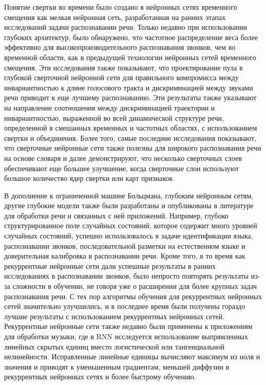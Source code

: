Понятие свертки во времени было создано в нейронных сетях временного смещения как мелкая нейронная сеть, разработанная на ранних этапах исследований задачи распознавании речи. Только недавно при использовании глубоких архитектур, было обнаружено, что частотное распределение веса более эффективно для высокопроизводительного распознавания звонков, чем во временной области, как в предыдущей технологии нейронных сетей временного смещения. Эти исследования также показывают, что проектирование пула в глубокой сверточной нейронной сети для правильного компромисса между инвариантностью к длине голосового тракта и дискриминацией между звуками речи приводит к еще лучшему распознаванию. Эти результаты также указывают на направление соотношения между дискриминацией траектории и инвариантностью, выраженной во всей динамической структуре речи, определенной в смешанных временных и частотных областях, с использованием свертки и объединения. Более того, самые последние исследования показывают, что сверточные нейронные сети также полезны для широкого распознавания речи на основе словаря и далее демонстрируют, что несколько сверточных слоев обеспечивают еще большее улучшение, когда сверточные слои используют большое количество ядер свертки или карт признаков.

В дополнение к ограниченной машине Больцмана, глубоким нейронным сетям, другие глубокие модели также были разработаны и опубликованы в литературе для обработки речи и связанных с ней приложений. Например, глубоко структурированное поле случайных состояний, которое содержит много уровней случайных состояний, успешно использовалось в задаче идентификации языка, распознавании звонков, последовательной разметки на естественном языке и доверительная калибровка в распознавании речи. Кроме того, в то время как рекуррентные нейронные сети дали успешные результаты в ранних исследованиях в распознавании звонков, было непросто повторять результаты из-за сложности в обучении, не говоря уже о расширении для более крупных задач распознавания речи. С тех пор алгоритмы обучения для рекуррентных нейронных сетей значительно улучшились, и в последнее время были получены гораздо лучшие результаты с использованием рекуррентных нейронных сетей. Рекуррентные нейронные сети также недавно были применены к приложениям для обработки музыки, где в RNN исследуется использование выпрямленных линейных скрытых единиц вместо логистической или тангенциальной нелинейности. Исправленные линейные единицы вычисляют максимум из ноля и значения и приводят к уменьшенным градиентам, меньшей диффузии в рекуррентных нейронных сетях и более быстрому обучению.
